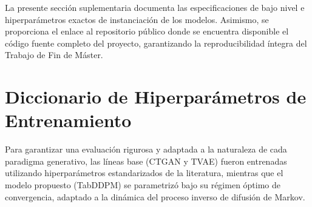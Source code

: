 \appendix
{}

\setcounter{section}{0}
\renewcommand{\thesection}{A.\arabic{section}}

La presente sección suplementaria documenta las especificaciones de bajo nivel e hiperparámetros exactos de instanciación de los modelos. Asimismo, se proporciona el enlace al repositorio público donde se encuentra disponible el código fuente completo del proyecto, garantizando la reproducibilidad íntegra del Trabajo de Fin de Máster.

\section{Diccionario de Hiperparámetros de Entrenamiento}

Para garantizar una evaluación rigurosa y adaptada a la naturaleza de cada paradigma generativo, las líneas base (CTGAN y TVAE) fueron entrenadas utilizando hiperparámetros estandarizados de la literatura, mientras que el modelo propuesto (TabDDPM) se parametrizó bajo su régimen óptimo de convergencia, adaptado a la dinámica del proceso inverso de difusión de Markov.


